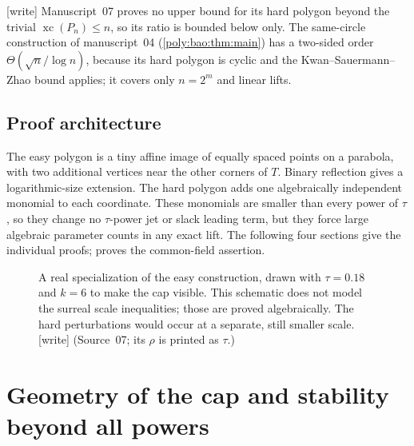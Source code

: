 \documentclass[11pt,a4paper]{article}
\numberwithin{equation}{section}
\theoremstyle{plain}
\newcommand{\wtag}{\textup{[write]}}%
\newcommand{\xc}{\operatorname{xc}}
\begin{document}
\wtag{} Manuscript~07 proves no upper bound for its hard polygon beyond the
trivial $\xc(P_n)\leq n$, so its ratio is bounded below only. The
same-circle construction of manuscript~04 (\cref{poly:bao:thm:main}) has a
two-sided order $\Theta(\sqrt n/\log n)$, because its hard polygon is
cyclic and the Kwan--Sauermann--Zhao bound applies; it covers only
$n=2^m$ and linear lifts.

\subsection{Proof architecture}
The easy polygon is a tiny affine image of equally spaced points on a
parabola, with two additional vertices near the other corners of $T$.
Binary reflection gives a logarithmic-size extension. The hard polygon
adds one algebraically independent monomial to each coordinate. These
monomials are smaller than every power of $\tau$, so they change no
$\tau$-power jet or slack leading term, but they force large algebraic
parameter counts in any exact lift. The following four sections give the
individual proofs;  proves the common-field assertion.

\begin{figure}[ht]
\centering
{}
\caption{A real specialization of the easy construction, drawn with
$\tau=0.18$ and $k=6$ to make the cap visible. This schematic does not model
the surreal scale inequalities; those are proved algebraically. The hard
perturbations would occur at a separate, still smaller scale.
\wtag{} (Source~07; its $\rho$ is printed as $\tau$.)}
\label{poly:ic:fig:cap}
\end{figure}

\section{Geometry of the cap and stability beyond all powers}\label{poly:ic:sec:geometry}
\end{document}
